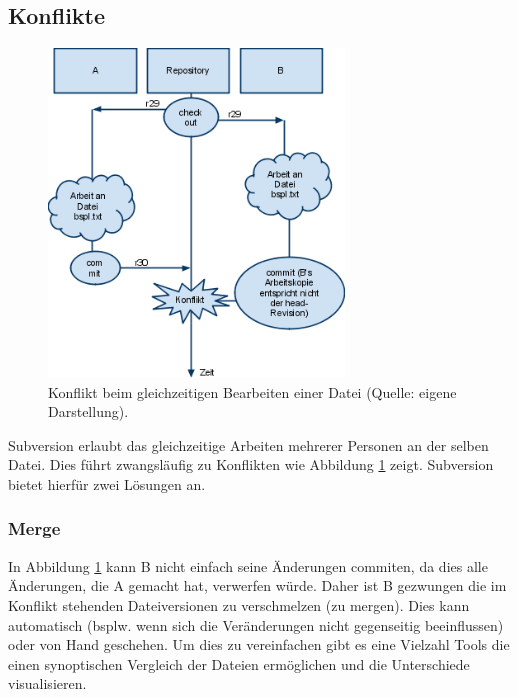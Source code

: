\subsection{Konflikte}
\begin{figure}[!htb]
\centering
\includegraphics[width=0.7\textwidth]{konflikt}
\caption{Konflikt beim gleichzeitigen Bearbeiten einer Datei (Quelle: eigene Darstellung).}
\label{fig:konflikt}
\end{figure}
Subversion erlaubt das gleichzeitige Arbeiten mehrerer Personen an der selben Datei. Dies führt zwangsläufig zu Konflikten wie Abbildung \ref{fig:konflikt} zeigt. Subversion bietet hierfür zwei Lösungen an.
\subsubsection{Merge}
In Abbildung \ref{fig:konflikt} kann B nicht einfach seine Änderungen commiten, da dies alle Änderungen, die A gemacht hat, verwerfen würde. Daher ist B gezwungen die im Konflikt stehenden Dateiversionen zu verschmelzen (zu mergen). Dies kann automatisch (bsplw. wenn sich die Veränderungen nicht gegenseitig beeinflussen) oder von Hand geschehen. Um dies zu vereinfachen gibt es eine Vielzahl Tools die einen synoptischen Vergleich der Dateien ermöglichen und die Unterschiede visualisieren.

